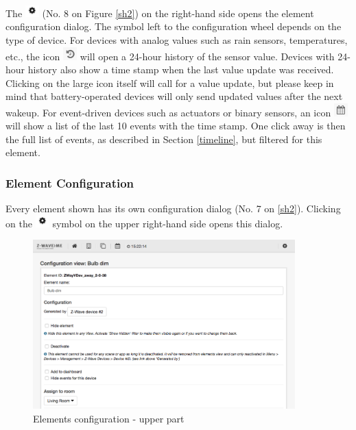 The \includegraphics[width=0.04\textwidth]{pngs/wheel.png} (No. 8 on Figure \ref{sh2}) on 
the right-hand side opens the element configuration dialog. The symbol left to the configuration 
wheel depends on the type of device. For devices with analog values such as rain sensors, 
temperatures, etc., the icon \includegraphics[width=0.04\textwidth]{pngs/24hour.png} will 
open a 24-hour history of the sensor value. Devices 
with 24-hour history also show a time stamp when the last value update was received. 
Clicking on the large icon itself will call for a value update, but please keep in mind 
that battery-operated devices will only send updated values after the next wakeup.
For event-driven devices such as actuators or binary sensors, an icon \includegraphics[width=0.04\textwidth]{pngs/10events.png}
will show a list 
of the last 10 events with the time stamp. One click away is then the full list of 
events, as described in Section \ref{timeline}, but filtered for this element.

\subsubsection{Element Configuration}
\label{ElementConfiguration}

Every element shown has its own configuration dialog (No. 7 on \ref{sh2}). Clicking 
on the \includegraphics[width=0.04\textwidth]{pngs/wheel.png} symbol on the upper right-hand 
side opens this dialog.

\begin{figure}
\begin{center}
\includegraphics[width=0.9\textwidth]{pngs/cap4/sh5.png}
\caption{Elements configuration - upper part}
\label{sh5}
\end{center}
\end{figure}

